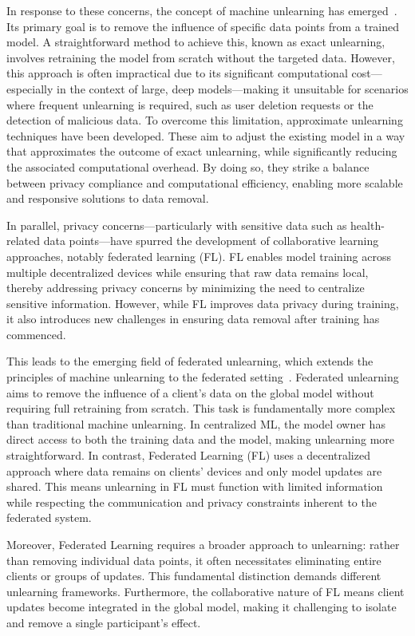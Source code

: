 \documentclass{article}
\begin{document}
In response to these concerns, the concept of machine unlearning has emerged~\citep{bourtoule2021machine}. Its primary goal is to remove the influence of specific data points from a trained model. A straightforward method to achieve this, known as exact unlearning, involves retraining the model from scratch without the targeted data. However, this approach is often impractical due to its significant computational cost—especially in the context of large, deep models—making it unsuitable for scenarios where frequent unlearning is required, such as user deletion requests or the detection of malicious data. To overcome this limitation, approximate unlearning techniques have been developed. These aim to adjust the existing model in a way that approximates the outcome of exact unlearning, while significantly reducing the associated computational overhead. By doing so, they strike a balance between privacy compliance and computational efficiency, enabling more scalable and responsive solutions to data removal.



In parallel, privacy concerns—particularly with sensitive data such as health-related data points—have spurred the development of collaborative learning approaches, notably federated learning (FL). FL enables model training across multiple decentralized devices while ensuring that raw data remains local, thereby addressing privacy concerns by minimizing the need to centralize sensitive information. However, while FL improves data privacy during training, it also introduces new challenges in ensuring data removal after training has commenced.

This leads to the emerging field of federated unlearning, which extends the principles of machine unlearning to the federated setting~\cite{romandini2024federated}. Federated unlearning aims to remove the influence of a client's data on the global model without requiring full retraining from scratch. This task is fundamentally more complex than traditional machine unlearning. In centralized ML, the model owner has direct access to both the training data and the model, making unlearning more straightforward. In contrast, Federated Learning (FL) uses a decentralized approach where data remains on clients' devices and only model updates are shared. This means unlearning in FL must function with limited information while respecting the communication and privacy constraints inherent to the federated system.

Moreover, Federated Learning requires a broader approach to unlearning: rather than removing individual data points, it often necessitates eliminating entire clients or groups of updates. This fundamental distinction demands different unlearning frameworks. Furthermore, the collaborative nature of FL means client updates become integrated in the global model, making it challenging to isolate and remove a single participant's effect.
\end{document}
